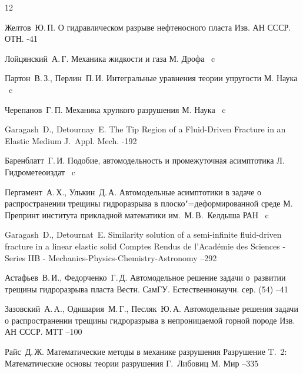\begin{thebibliography}{12}

\by Желтов~Ю.\,П.
\paper О гидравлическом разрыве нефтеносного пласта
\jour Изв. АН СССР. ОТН.
-41

\by Лойцянский~А.\,Г.
\book Механика жидкости и газа
\publaddr М.
\publ Дрофа
~c

\by Партон~В.\,З., Перлин~П.\,И.
\book Интегральные уравнения теории упругости
\publaddr М.
\publ Наука
~c

\by Черепанов~Г.\,П.
\book Механика хрупкого разрушения
\publaddr М.
\publ Наука
~c

\by Garagash~D., Detournay~E.
\paper The Tip Region of a Fluid-Driven Fracture in an Elastic Medium
\jour J.~Appl. Mech.
-192

\by Баренблатт~Г.\,И.
\book Подобие, автомодельность и промежуточная асимптотика
\publaddr Л.
\publ Гидрометеоиздат
~c


\by Пергамент~А.\,Х., Улькин~Д.\,А.
\preprint Автомодельные асимптотики в задаче о распространении трещины гидроразрыва в плоско"=деформированной среде
\publaddr М.
\preprintinfo Препринт института прикладной математики им.~М.\,В.~Келдыша РАН
~c




\by  Garagash~D.,   Detournat~E.
\paper Similarity solution of a semi-infinite fluid-driven fracture in a linear elastic solid 
\jour Comptes Rendus de l'Acad\'{e}mie des Sciences - Series IIB - Mechanics-Physics-Chemistry-Astronomy
--292

\by Астафьев~В.\,И., Федорченко~Г.\,Д.
\paper Автомодельное решение задачи о~развитии трещины гидроразрыва пласта
\jour Вестн. СамГУ. Естественнонаучн. сер.
(54)
--41

\by Зазовский~А.\,A., Одишария~М.\,Г., Песляк~Ю.\,А.
\paper Автомодельные  решения задачи о распространении трещины гидроразрыва в непроницаемой горной породе
\jour Изв. АН СССР. МТТ
--100

\by Райс~Д.\,Ж.
\paper Математические методы в механике разрушения
\inbook Разрушение
\bookinfo T.~2: Математические основы теории разрушения
\ed Г.~Либовиц
\publaddr М.
\publ Мир
--335

\end{thebibliography}

\makeengtitle

%
